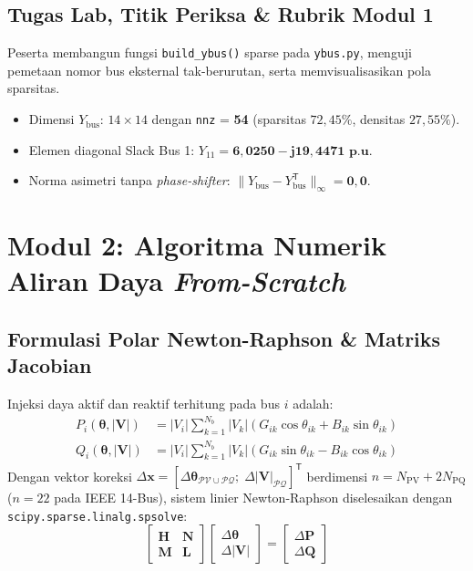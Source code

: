 \documentclass[11pt,a4paper]{report}
\begin{document}
\section{Tugas Lab, Titik Periksa \& Rubrik Modul 1}
Peserta membangun fungsi \texttt{build\_ybus()} sparse pada \texttt{ybus.py}, menguji pemetaan nomor bus eksternal tak-berurutan, serta memvisualisasikan pola sparsitas.

\begin{checkpointbox}
\begin{itemize}[leftmargin=1.3em]
  \item Dimensi $Y_{\text{bus}}$: $14 \times 14$ dengan \texttt{nnz} = \textbf{54} (sparsitas $72{,}45\%$, densitas $27{,}55\%$).
  \item Elemen diagonal Slack Bus 1: $Y_{11} = \mathbf{6{,}0250 - j19{,}4471\text{ p.u.}}$
  \item Norma asimetri tanpa \textit{phase-shifter}: $\|Y_{\text{bus}} - Y_{\text{bus}}^{\mathsf{T}}\|_{\infty} = \mathbf{0{,}0}$.
\end{itemize}
\end{checkpointbox}

\chapter{Modul 2: Algoritma Numerik Aliran Daya \textit{From-Scratch}}

\section{Formulasi Polar Newton-Raphson \& Matriks Jacobian}
Injeksi daya aktif dan reaktif terhitung pada bus $i$ adalah:
\begin{align}
  P_i(\boldsymbol{\theta}, |\mathbf{V}|) &= |V_i|\sum_{k=1}^{N_b} |V_k|\left(G_{ik}\cos\theta_{ik} + B_{ik}\sin\theta_{ik}\right) \\
  Q_i(\boldsymbol{\theta}, |\mathbf{V}|) &= |V_i|\sum_{k=1}^{N_b} |V_k|\left(G_{ik}\sin\theta_{ik} - B_{ik}\cos\theta_{ik}\right)
\end{align}
Dengan vektor koreksi $\Delta\mathbf{x} = [\Delta\boldsymbol{\theta}_{\mathcal{PV}\cup\mathcal{PQ}};\; \Delta|\mathbf{V}|_{\mathcal{PQ}}]^{\mathsf{T}}$ berdimensi $n = N_{\text{PV}} + 2N_{\text{PQ}}$ ($n = 22$ pada IEEE 14-Bus), sistem linier Newton-Raphson diselesaikan dengan \texttt{scipy.sparse.linalg.spsolve}:
\begin{equation}
  \begin{bmatrix} \mathbf{H} & \mathbf{N} \\ \mathbf{M} & \mathbf{L} \end{bmatrix}
  \begin{bmatrix} \Delta\boldsymbol{\theta} \\ \Delta|\mathbf{V}| \end{bmatrix}
  =
  \begin{bmatrix} \Delta\mathbf{P} \\ \Delta\mathbf{Q} \end{bmatrix}
\end{equation}
\end{document}
